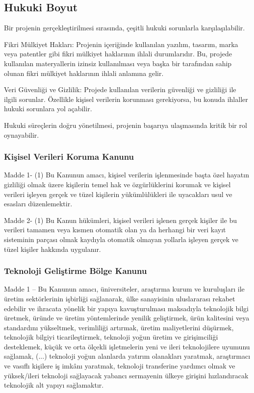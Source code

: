 \subsection{Hukuki Boyut}
Bir projenin gerçekleştirilmesi sırasında, çeşitli hukuki sorunlarla karşılaşılabilir.

Fikri Mülkiyet Hakları: Projenin içeriğinde kullanılan yazılım, tasarım, marka veya patentler gibi fikri mülkiyet haklarının ihlali durumlarıdır. Bu, projede kullanılan materyallerin izinsiz kullanılması veya başka bir tarafından sahip olunan fikri mülkiyet haklarının ihlali anlamına gelir.

Veri Güvenliği ve Gizlilik: Projede kullanılan verilerin güvenliği ve gizliliği ile ilgili sorunlar. Özellikle kişisel verilerin korunması gerekiyorsa, bu konuda ihlaller hukuki sorunlara yol açabilir.

Hukuki süreçlerin doğru yönetilmesi, projenin başarıya ulaşmasında kritik bir rol oynayabilir.

\subsubsection{Kişisel Verileri Koruma Kanunu}

Madde 1- (1) Bu Kanunun amacı, kişisel verilerin işlenmesinde başta özel hayatın gizliliği
olmak üzere kişilerin temel hak ve özgürlüklerini korumak ve kişisel verileri işleyen gerçek ve
tüzel kişilerin yükümlülükleri ile uyacakları usul ve esasları düzenlemektir.

Madde 2- (1) Bu Kanun hükümleri, kişisel verileri işlenen gerçek kişiler ile bu verileri
tamamen veya kısmen otomatik olan ya da herhangi bir veri kayıt sisteminin parçası olmak
kaydıyla otomatik olmayan yollarla işleyen gerçek ve tüzel kişiler hakkında uygulanır.

\subsubsection{Teknoloji Geliştirme Bölge Kanunu}

Madde 1 – Bu Kanunun amacı, üniversiteler, araştırma kurum ve kuruluşları ile üretim
sektörlerinin işbirliği sağlanarak, ülke sanayisinin uluslararası rekabet edebilir ve ihracata yönelik bir yapıya kavuşturulması maksadıyla teknolojik bilgi üretmek, üründe ve üretim yöntemlerinde yenilik geliştirmek, ürün kalitesini veya standardını yükseltmek, verimliliği artırmak, üretim maliyetlerini düşürmek, teknolojik bilgiyi ticarileştirmek, teknoloji yoğun üretim ve girişimciliği desteklemek, küçük ve orta ölçekli işletmelerin yeni ve ileri teknolojilere uyumunu sağlamak, (...)\textsuperscript{\cite{kanun7263}} teknoloji yoğun alanlarda yatırım olanakları yaratmak, araştırmacı ve vasıflı kişilere iş
imkânı yaratmak, teknoloji transferine yardımcı olmak ve yüksek/ileri teknoloji sağlayacak yabancı sermayenin ülkeye girişini hızlandıracak teknolojik alt yapıyı sağlamaktır.

